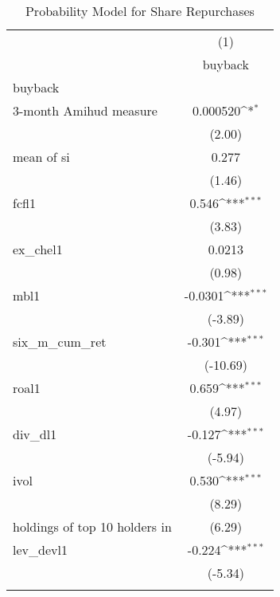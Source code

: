 \begin{table}[htbp]\centering
\def\sym#1{\ifmmode^{#1}\else\(^{#1}\)\fi}
\caption{Probability Model for Share Repurchases}
\begin{tabular*}{0.8\hsize}{@{\hskip\tabcolsep\extracolsep\fill}l*{1}{c}}
\toprule
                    &\multicolumn{1}{c}{(1)}\\
                    &\multicolumn{1}{c}{buyback}\\
\midrule
buyback             &                     \\
3-month Amihud measure&    0.000520\sym{*}  \\
                    &      (2.00)         \\
\addlinespace
mean of si          &       0.277         \\
                    &      (1.46)         \\
\addlinespace
fcfl1               &       0.546\sym{***}\\
                    &      (3.83)         \\
\addlinespace
ex\_chel1            &      0.0213         \\
                    &      (0.98)         \\
\addlinespace
mbl1                &     -0.0301\sym{***}\\
                    &     (-3.89)         \\
\addlinespace
six\_m\_cum\_ret       &      -0.301\sym{***}\\
                    &    (-10.69)         \\
\addlinespace
roal1               &       0.659\sym{***}\\
                    &      (4.97)         \\
\addlinespace
div\_dl1             &      -0.127\sym{***}\\
                    &     (-5.94)         \\
\addlinespace
ivol                &       0.530\sym{***}\\
                    &      (8.29)         \\
\addlinespace
holdings of top 10 holders in %
                    &      (6.29)         \\
\addlinespace
lev\_devl1           &      -0.224\sym{***}\\
                    &     (-5.34)         \\
\addlinespace

\end{tabular*}
\end{table}
